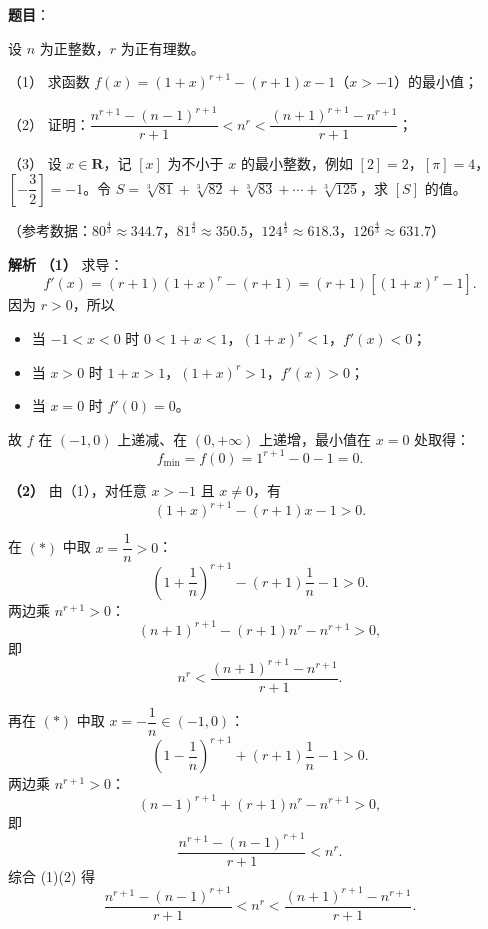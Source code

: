 \begin{answer}

\textbf{题目}：

设 $n$ 为正整数，$r$ 为正有理数。

（1） 求函数 $f(x)=(1+x)^{r+1}-(r+1)x-1$（$x>-1$）的最小值；

（2） 证明：$\dfrac{n^{r+1}-(n-1)^{r+1}}{r+1}<n^r<\dfrac{(n+1)^{r+1}-n^{r+1}}{r+1}$；

（3） 设 $x\in\mathbf R$，记 $[x]$ 为不小于 $x$ 的最小整数，例如 $[2]=2$，$[\pi]=4$，$\left[-\dfrac32\right]=-1$。令 $S=\sqrt[3]{81}+\sqrt[3]{82}+\sqrt[3]{83}+\cdots+\sqrt[3]{125}$，求 $[S]$ 的值。

（参考数据：$80^{\frac43}\approx344.7$，$81^{\frac43}\approx350.5$，$124^{\frac43}\approx618.3$，$126^{\frac43}\approx631.7$）

\textbf{解析}
\textbf{（1）} 求导：
\nopagebreak[4]
\[f'(x)=(r+1)(1+x)^r-(r+1)=(r+1)\left[(1+x)^r-1\right].\]
因为 $r>0$，所以
\begin{itemize}
\item 当 $-1<x<0$ 时 $0<1+x<1$，$(1+x)^r<1$，$f'(x)<0$；
\item 当 $x>0$ 时 $1+x>1$，$(1+x)^r>1$，$f'(x)>0$；
\item 当 $x=0$ 时 $f'(0)=0$。
\end{itemize}

故 $f$ 在 $(-1,0)$ 上递减、在 $(0,+\infty)$ 上递增，最小值在 $x=0$ 处取得：
\nopagebreak[4]
\[f_{\min}=f(0)=1^{r+1}-0-1=0.\]

\textbf{（2）} 由（1），对任意 $x>-1$ 且 $x\neq0$，有
\nopagebreak[4]
\[(1+x)^{r+1}-(r+1)x-1>0. \tag{$*$}\]

在 $(*)$ 中取 $x=\dfrac1n>0$：
\nopagebreak[4]
\[\left(1+\frac1n\right)^{r+1}-(r+1)\frac1n-1>0.\]
两边乘 $n^{r+1}>0$：
\nopagebreak[4]
\[(n+1)^{r+1}-(r+1)n^r-n^{r+1}>0,\]
即
\nopagebreak[4]
\[n^r<\frac{(n+1)^{r+1}-n^{r+1}}{r+1}. \tag{1}\]

再在 $(*)$ 中取 $x=-\dfrac1n\in(-1,0)$：
\nopagebreak[4]
\[\left(1-\frac1n\right)^{r+1}+(r+1)\frac1n-1>0.\]
两边乘 $n^{r+1}>0$：
\nopagebreak[4]
\[(n-1)^{r+1}+(r+1)n^r-n^{r+1}>0,\]
即
\nopagebreak[4]
\[\frac{n^{r+1}-(n-1)^{r+1}}{r+1}<n^r. \tag{2}\]
综合 (1)(2) 得
\nopagebreak[4]
\[\frac{n^{r+1}-(n-1)^{r+1}}{r+1}<n^r<\frac{(n+1)^{r+1}-n^{r+1}}{r+1}.\]


\end{answer}
